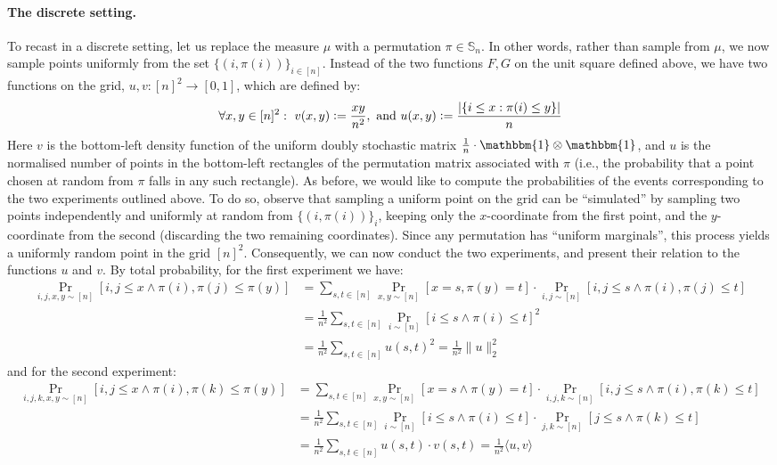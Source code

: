 \documentclass{article}
\newcommand{\Sn}{\mathbb{S}_n}
\newcommand{\eqdef}{\vcentcolon=}
\theoremstyle{remark}
\theoremstyle{plain}
\begin{document}
\paragraph{The discrete setting.} To recast \cite{kral2013quasirandom} in a discrete setting, let us replace the measure $\mu$ with a permutation $\pi \in \Sn$. In other words, rather than sample from $\mu$, we now sample points uniformly from the set $\{(i, \pi(i))\}_{i \in [n]}$. Instead of the two functions $F,G$ on the unit square defined above, we have two functions on the grid, $u,v: [n]^2 \to [0,1]$, which are defined by:
\[
    \forall x,y \in [n]^2:\ v(x,y) \eqdef \frac{xy}{n^2}, \text{ and } u(x,y) \eqdef \frac{|\{i \le x:\pi(i) \le y\}| }{n}
\]
Here $v$ is the bottom-left density function of the uniform doubly stochastic matrix $\frac{1}{n} \cdot \mathbbm{1} \otimes \mathbbm{1}$, and $u$ is the normalised number of points in the bottom-left rectangles of the permutation matrix associated with $\pi$ (i.e., the probability that a point chosen at random from $\pi$ falls in any such rectangle). As before, we would like to compute the probabilities of the events corresponding to the two experiments outlined above. To do so, observe that sampling a uniform point on the grid can be ``simulated'' by sampling two points independently and uniformly at random from $\{(i, \pi(i))\}_i$, keeping only the $x$-coordinate from the first point, and the $y$-coordinate from the second (discarding the two remaining coordinates). Since any permutation has ``uniform marginals'', this process yields a uniformly random point in the grid $[n]^2$. Consequently, we can now conduct the two experiments, and present their relation to the functions $u$ and $v$. By total probability, for the first experiment we have:
\begin{align*}
    \Pr_{i,j,x,y \sim [n]}[i,j \le x \land \pi(i),\pi(j) \le \pi(y) ] &= \sum_{s, t \in [n]} \Pr_{x,y \sim [n]}[x=s, \pi(y)=t] \cdot \Pr_{i,j \sim [n]}[i,j \le s \land \pi(i),\pi(j) \le t ] \\
    &= \frac{1}{n^2} \sum_{s,t \in [n]} \Pr_{i \sim [n]}[i \le s \land \pi(i) \le t]^2 \\
    &= \frac{1}{n^2} \sum_{s,t \in [n]} u(s,t)^2 = \frac{1}{n^2} \| u \| _2^2
\end{align*}
and for the second experiment: 
\begin{align*}
    \Pr_{i,j,k,x,y \sim [n]}[i,j \le x \land \pi(i),\pi(k) \le \pi(y) ] &= \sum_{s, t \in [n]} \Pr_{x,y \sim [n]}[x=s \land \pi(y)=t] \cdot \Pr_{i,j,k \sim [n]}[i,j \le s \land \pi(i),\pi(k) \le t ] \\
    &= \frac{1}{n^2} \sum_{s,t \in [n]} \Pr_{i \sim [n]}[i \le s \land \pi(i) \le t] \cdot \Pr_{j,k \sim [n]}[j \le s \land \pi(k) \le t] \\
    &= \frac{1}{n^2} \sum_{s,t \in [n]} u(s,t) \cdot v(s,t) = \frac{1}{n^2} \langle u, v \rangle
\end{align*}
\end{document}
